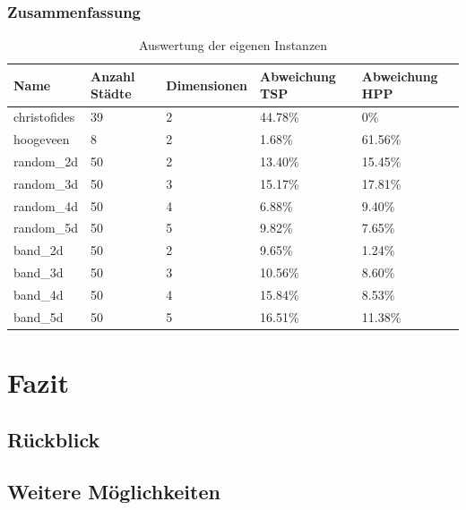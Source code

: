 \documentclass[11pt,a4paper]{article}
\begin{document}
\subsubsection{Zusammenfassung}
    \begin{table}[H]
                \centering
                \begin{tabular}{| p{2.0cm} | p{2.0cm} | p{2.5cm} | p{2.5cm} | p{2.5cm} |}
                    \hline
                    \small{\textbf{Name}} &
                    \small{\textbf{Anzahl Städte}}  & 
                    \small{\textbf{Dimensionen}} & 
                    \small{\textbf{Abweichung TSP}} & 
                    \small{\textbf{Abweichung HPP}} \\ \hline

                    christofides    & 39    & 2     & 44.78\%   & 0\%           \\ \hline
                    hoogeveen       & 8     & 2     & 1.68\%    & 61.56\%       \\ \hline
                    random\_2d      & 50    & 2     & 13.40\%   & 15.45\%       \\ \hline
                    random\_3d      & 50    & 3     & 15.17\%   & 17.81\%       \\ \hline
                    random\_4d      & 50    & 4     & 6.88\%    & 9.40\%        \\ \hline
                    random\_5d      & 50    & 5     & 9.82\%    & 7.65\%        \\ \hline
                    band\_2d        & 50    & 2     & 9.65\%    & 1.24\%        \\ \hline
                    band\_3d        & 50    & 3     & 10.56\%   & 8.60\%        \\ \hline
                    band\_4d        & 50    & 4     & 15.84\%   & 8.53\%        \\ \hline
                    band\_5d        & 50    & 5     & 16.51\%   & 11.38\%       \\ \hline
               \end{tabular}
                \caption{Auswertung der eigenen Instanzen}
                \label{tab:instanz_eigene_instanzen}
        \end{table}

\newpage

\section{Fazit}
\subsection{Rückblick}
\subsection{Weitere Möglichkeiten}

\newpage



\end{document}

